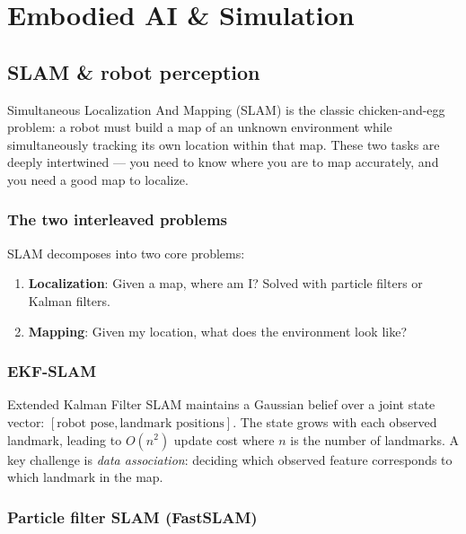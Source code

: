 
\section{Embodied AI \& Simulation}

\subsection{SLAM \& robot perception}

\begin{intuitionbox}
Simultaneous Localization And Mapping (SLAM) is the classic chicken-and-egg problem: a robot must build a map of an unknown environment while simultaneously tracking its own location within that map. These two tasks are deeply intertwined — you need to know where you are to map accurately, and you need a good map to localize.
\end{intuitionbox}

\subsubsection{The two interleaved problems}

SLAM decomposes into two core problems:
\begin{enumerate}
\item \textbf{Localization}: Given a map, where am I? Solved with particle filters or Kalman filters.
\item \textbf{Mapping}: Given my location, what does the environment look like?
\end{enumerate}

\subsubsection{EKF-SLAM}

Extended Kalman Filter SLAM maintains a Gaussian belief over a joint state vector: $[\text{robot pose}, \text{landmark positions}]$. The state grows with each observed landmark, leading to $O(n^2)$ update cost where $n$ is the number of landmarks. A key challenge is \emph{data association}: deciding which observed feature corresponds to which landmark in the map.

\subsubsection{Particle filter SLAM (FastSLAM)}

